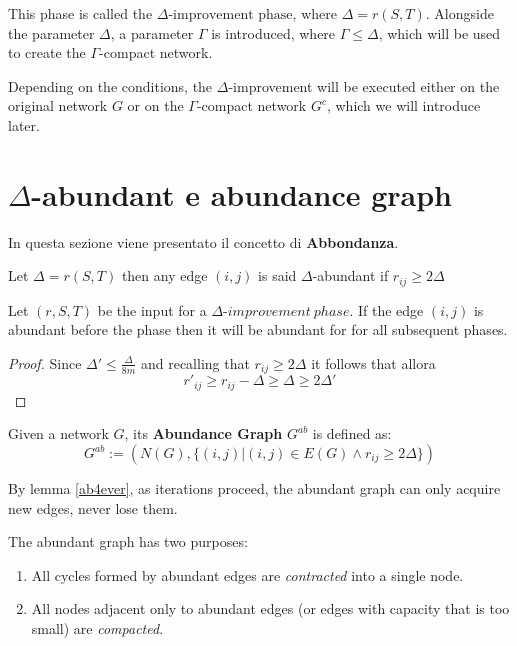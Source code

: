 This phase is called the \(\Delta\text{-improvement phase}\), where \(\Delta = r(S, T)\). Alongside the parameter \(\Delta\), a parameter \(\Gamma\) is introduced, where \(\Gamma \leq \Delta\), which will be used to create the \(\Gamma\)-compact network.

Depending on the conditions, the \(\Delta\)-improvement will be executed either on the original network \(G\) or on the \(\Gamma\)-compact network \(G^c\), which we will introduce later.
\newpage

\section{$\Delta$-abundant e abundance graph}
In questa sezione viene presentato il concetto di \textbf{Abbondanza}.

\begin{definition}
    Let $\Delta = r(S,T)$ then any edge $(i,j)$ is said $\Delta$-abundant if $r_{ij} \ge 2\Delta$ 
     
\end{definition}
\begin{lemma}
    \label{ab4ever}
    Let $(r,S,T)$ be the input for a $\Delta\text{-}improvement\ phase$. If the edge  $(i,j)$ is abundant before the phase then it will be abundant for for all subsequent phases.
\end{lemma}
\begin{proof}
    Since
    $\Delta' \le \frac{\Delta}{8m} $ and recalling that $r_{ij} \ge 2\Delta $ it follows that 
    allora \[r'_{ij} \ge r_{ij}-\Delta \ge\Delta\ge  2\Delta'\]
\end{proof}

\begin{definition}
    Given a network $G$, its \textbf{Abundance Graph} $G^{ab}$ is defined as: 
    \[G^{ab} := (N(G), \{(i,j)| (i,j)\in E(G)\land r_{ij}\ge 2\Delta\})\]
\end{definition}

\begin{obs}
    By lemma \ref{ab4ever}, as iterations proceed, the abundant graph can only acquire new edges, never lose them.
\end{obs}

The abundant graph has two purposes: 
\begin{enumerate}
    \item All cycles formed by abundant edges are \textit{contracted} into a single node.
    \item All nodes adjacent only to abundant edges (or edges with capacity that is too small) are \textit{compacted}.
\end{enumerate}

